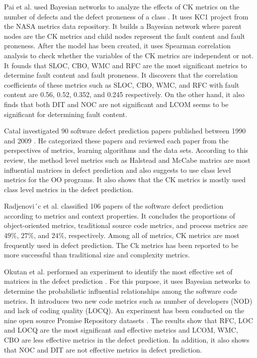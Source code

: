 \documentclass[12pt]{report}
\begin{document}
Pai et al. used Bayesian networks to analyze the effects of CK metrics \cite{chidamber1994metrics} on the number of defects and the defect proneness of a class \cite{pai2007empirical}. It uses KC1 project from the NASA metrics data repository. It builds a Bayesian network where parent nodes are the CK metrics \cite{chidamber1994metrics} and child nodes represent the fault content and fault proneness. After the model has been created, it uses  Spearman correlation analysis to check whether the variables of the CK metrics are independent or not. It founds that SLOC, CBO, WMC and RFC are the most significant metrics to determine fault content and fault proneness. It discovers that the correlation coefficients of these metrics such as SLOC, CBO, WMC, and RFC with fault content are 0.56, 0.52, 0.352, and 0.245 respectively. On the other hand, it also finds that both DIT and NOC are not significant and LCOM seems to be significant for determining fault content.
   
Catal investigated 90 software defect prediction papers published between 1990 and 2009 \cite{catal2009systematic}. He categorized these papers and reviewed each paper from the perspectives of metrics, learning algorithms and the data sets. According to this review, the method level metrics such as Halstead \cite{halstead1977elements} and McCabe \cite{mccabe1976complexity} matrics are most influential matrices in defect prediction and also suggests to use class level metrics for the OO programs. It also shows that the CK metrics is mostly used class level metrics in the defect prediction. 
 
Radjenovi´c et al. \cite{radjenovic2013software} classified 106 papers of the software defect prediction according to metrics and context properties. It concludes the proportions of object-oriented metrics, traditional source code metrics, and process metrics are $49\%$, $27\%$, and $24\%$, respectively. Among all of metrics, CK \cite{chidamber1994metrics} metrics are most frequently used in defect prediction. The Ck metrics has been reported to be more successful than traditional size and complexity metrics. 

Okutan et al. performed an experiment to identify the most effective set of matrices in the defect prediction \cite{okutan2014software}. For this purpose, it uses Bayesian networks to determine the probabilistic influential relationships among the software code metrics. It introduces two new code metrics such as number of developers (NOD) and lack of coding quality (LOCQ). An experiment has been conducted on the nine open source Promise Repository  datasets \cite{promise12}. The results show that RFC, LOC and LOCQ are the most significant and effective metrics and LCOM, WMC, CBO are less effective metrics in the defect prediction. In addition, it also shows that NOC and DIT are not effective metrics in defect prediction. 
\end{document}
